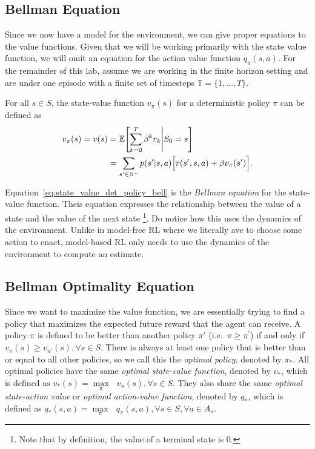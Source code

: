 \subsection*{Bellman Equation}
Since we now have a model for the environment, we can give proper equations to the value functions.
Given that we will be working primarily with the state value function, we will omit an equation for the action value function $q_\pi(s,a)$.
For the remainder of this lab, assume we are working in the finite horizon setting and are under one episode with a finite set of timesteps $\mathbb{T}=\{1,\ldots,T\}$.

For all $s\in S$, the state-value function $v_\pi(s)$ for a deterministic policy $\pi$ can be defined as
\begin{subequations}
    \label{eq:state_value_det_policy}
    \begin{align}
        v_{\pi}(s)=v(s) &= \mathbb{E} \Biggl[ \sum_{k=0}^T \beta^k r_k \Biggl\lvert S_0=s  \Biggr] \label{eq:state_value_det_policy_def}\\
                        &= \sum_{s^\prime\in S^+}p(s^\prime|s,a) \Bigl[r(s^\prime, s, a) + \beta v_\pi(s^\prime) \Bigr]. \label{eq:state_value_det_policy_bell}
    \end{align}
\end{subequations}

Equation\ \ref{eq:state_value_det_policy_bell} is the \emph{Bellman equation} for the state-value function.
Theis equation expresses the relationship between the value of a state and the value of the next state \footnote{Note that by definition, the value of a terminal state is 0.}.
Do notice how this uses the dynamics of the environment.
Unlike in model-free RL where we literally ave to choose some action to enact, model-based RL only needs to use the dynamics of the environment to compute an estimate.

\subsection*{Bellman Optimality Equation}
Since we want to maximize the value function, we are essentially trying to find a policy that maximizes the expected future reward that the agent can receive.
A policy $\pi$ is defined to be better than another policy $\pi'$ (i.e.\ $\pi \geq \pi^\prime$) if and only if $v_{\pi}(s) \geq v_{\pi'}(s), \forall s\in S$.
There is always at least one policy that is better than or equal to all other policies, so we call this the \emph{optimal policy}, denoted by $\pi_*$.
All optimal policies have the same \emph{optimal state-value function}, denoted by $v_*$, which is defined as $v_*(s)=\underset{\pi}{\max}\text{ } v_\pi(s), \forall s\in S$.
They also share the same \emph{optimal state-action value} or \emph{optimal action-value function}, denoted by $q_*$, which is defined as $q_*(s,a)=\underset{\pi}{\max}\text{ } q_\pi(s,a), \forall s\in S, \forall a\in A_s$.

